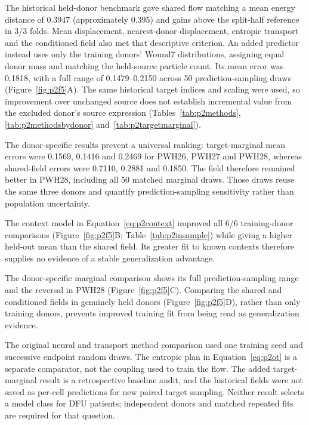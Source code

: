 The historical held-donor benchmark gave shared flow matching a mean energy distance of 0.3947 (approximately 0.395) and gains above the split-half reference in 3/3 folds. Mean displacement, nearest-donor displacement, entropic transport and the conditioned field also met that descriptive criterion. An added predictor instead uses only the training donors' Wound7 distributions, assigning equal donor mass and matching the held-source particle count. Its mean error was 0.1818, with a full range of 0.1479--0.2150 across 50 prediction-sampling draws (Figure~\ref{fig:p2f5}A\label{call:p2f5}). The same historical target indices and scaling were used, so improvement over unchanged source does not establish incremental value from the excluded donor's source expression (Tables~\ref{tab:p2methods}, \ref{tab:p2methodsbydonor} and~\ref{tab:p2targetmarginal}).

The donor-specific results prevent a universal ranking: target-marginal mean errors were 0.1569, 0.1416 and 0.2469 for PWH26, PWH27 and PWH28, whereas shared-field errors were 0.7110, 0.2881 and 0.1850. The field therefore remained better in PWH28, including all 50 matched marginal draws. Those draws reuse the same three donors and quantify prediction-sampling sensitivity rather than population uncertainty.

The context model in Equation~\eqref{eq:p2context} improved all 6/6 training-donor comparisons (Figure~\ref{fig:p2f5}B; Table~\ref{tab:p2insample}) while giving a higher held-out mean than the shared field. Its greater fit to known contexts therefore supplies no evidence of a stable generalization advantage.



The donor-specific marginal comparison shows its full prediction-sampling range and the reversal in PWH28 (Figure~\ref{fig:p2f5}C). Comparing the shared and conditioned fields in genuinely held donors (Figure~\ref{fig:p2f5}D), rather than only training donors, prevents improved training fit from being read as generalization evidence.

The original neural and transport method comparison used one training seed and successive endpoint random draws. The entropic plan in Equation~\eqref{eq:p2ot} is a separate comparator, not the coupling used to train the flow. The added target-marginal result is a retrospective baseline audit, and the historical fields were not saved as per-cell predictions for new paired target sampling. Neither result selects a model class for DFU patients; independent donors and matched repeated fits are required for that question.

